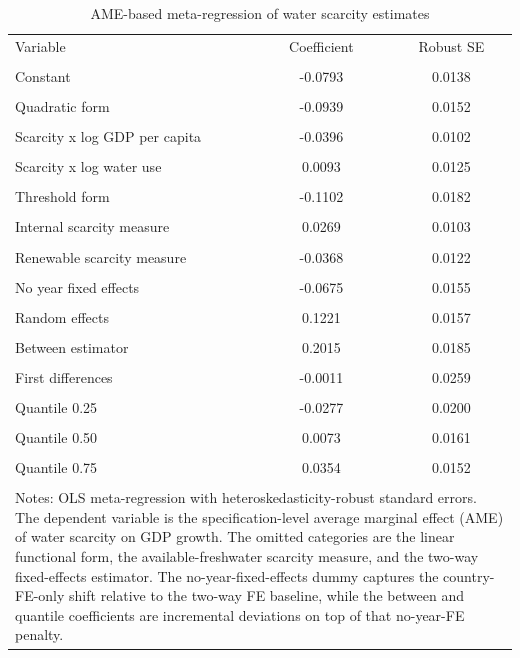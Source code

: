 \begin{table}[htbp]
\centering
\caption{AME-based meta-regression of water scarcity estimates}
\label{tab:meta_ame}
\small
\begin{tabular}{lcc}
\toprule
Variable & Coefficient & Robust SE \\\\
\midrule
Constant & -0.0793 & 0.0138 \\\\
Quadratic form & -0.0939 & 0.0152 \\\\
Scarcity x log GDP per capita & -0.0396 & 0.0102 \\\\
Scarcity x log water use & 0.0093 & 0.0125 \\\\
Threshold form & -0.1102 & 0.0182 \\\\
Internal scarcity measure & 0.0269 & 0.0103 \\\\
Renewable scarcity measure & -0.0368 & 0.0122 \\\\
No year fixed effects & -0.0675 & 0.0155 \\\\
Random effects & 0.1221 & 0.0157 \\\\
Between estimator & 0.2015 & 0.0185 \\\\
First differences & -0.0011 & 0.0259 \\\\
Quantile 0.25 & -0.0277 & 0.0200 \\\\
Quantile 0.50 & 0.0073 & 0.0161 \\\\
Quantile 0.75 & 0.0354 & 0.0152 \\\\
\bottomrule
\multicolumn{3}{p{0.9\textwidth}}{\footnotesize Notes: OLS meta-regression with heteroskedasticity-robust standard errors. The dependent variable is the specification-level average marginal effect (AME) of water scarcity on GDP growth. The omitted categories are the linear functional form, the available-freshwater scarcity measure, and the two-way fixed-effects estimator. The no-year-fixed-effects dummy captures the country-FE-only shift relative to the two-way FE baseline, while the between and quantile coefficients are incremental deviations on top of that no-year-FE penalty.}
\end{tabular}
\end{table}
